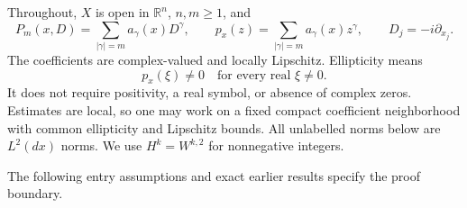 \documentclass[
  11pt,
]{article}
\begin{document}
Throughout, \(X\) is open in \(\mathbb R^n\), \(n,m\geq1\), and \[
 P_m(x,D)=\sum_{|\gamma|=m}a_\gamma(x)D^\gamma,\qquad
 p_x(z)=\sum_{|\gamma|=m}a_\gamma(x)z^\gamma,\qquad
 D_j=-i\partial_{x_j}.                                             \tag{S1}
\] The coefficients are complex-valued and locally Lipschitz.
Ellipticity means \[
 p_x(\xi)\ne0\quad\text{for every real }\xi\ne0.                     \tag{S2}
\] It does not require positivity, a real symbol, or absence of complex
zeros. Estimates are local, so one may work on a fixed compact
coefficient neighborhood with common ellipticity and Lipschitz bounds.
All unlabelled norms below are \(L^2(dx)\) norms. We use \(H^k=W^{k,2}\)
for nonnegative integers.

The following entry assumptions and exact earlier results specify the
proof boundary.
\end{document}
